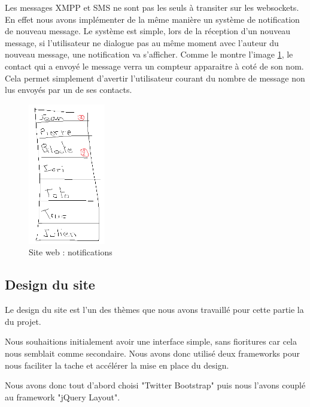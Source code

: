 Les messages XMPP et SMS ne sont pas les seuls à transiter sur les websockets. En effet nous avons 
implémenter de la même manière un système de notification de nouveau message. Le système est simple,
lors de la réception d'un nouveau message, si l'utilisateur ne dialogue pas au même moment avec l'auteur
du nouveau message, une notification va s'afficher. Comme le montre l'image \ref{siteWeb_notifications}, le contact
qui a envoyé le message verra un compteur apparaitre à coté de son nom. Cela permet simplement d'avertir
l'utilisateur courant du nombre de message non lus envoyés par un de ses contacts.
\begin{figure}[!h]
	\center
	\includegraphics[width=0.3\textwidth]{img/siteWeb_notifications.png}
	\caption{Site web : notifications}
	\label{siteWeb_notifications}
\end{figure}

\subsection{Design du site}

Le design du site est l'un des thèmes que nous avons travaillé pour cette partie la du projet.

Nous souhaitions initialement avoir une interface simple, sans fioritures car cela nous semblait comme
secondaire. Nous avons donc utilisé deux frameworks pour nous faciliter la tache et accélérer la mise
en place du design.

Nous avons donc tout d'abord choisi "Twitter Bootstrap" puis nous l'avons couplé au framework "jQuery
Layout".


